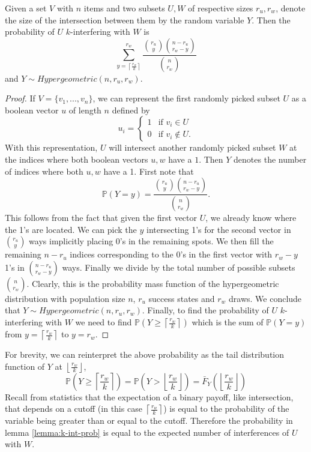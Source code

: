 \begin{lemma}
    \label{lemma:k-int-prob}
	Given a set $V$ with $n$ items and two subsets $U,W$ of respective sizes $r_u,r_w$, denote the size of the intersection between them by the random variable $Y$. Then the probability of $U$ $k$-interfering with $W$ is $$\sum_{y = \left\lceil \frac{r_w}{k} \right\rceil}^{r_w} \frac{\binom{r_u}{y} \binom{n-r_u}{r_w-y}}{\binom{n}{r_w}}$$ and $Y \sim Hypergeometric(n, r_u, r_w)$.
\end{lemma}
\begin{proof}
	If $V = \{v_1,...,v_n\}$, we can represent the first randomly picked subset $U$ as a boolean vector $u$ of length $n$ defined by
    $$
    u_i = \begin{cases}
        1 & \text{if } v_i \in U \\
        0 & \text{if } v_i \notin U.
    \end{cases}
    $$
    With this representation, $U$ will intersect another randomly picked subset $W$ at the indices where both boolean vectors $u, w$ have a $1$. Then $Y$ denotes the number of indices where both $u, w$ have a 1. First note that
    \begin{equation}
        \mathbb{P}(Y=y) = \frac{\binom{r_u}{y} \binom{n-r_u}{r_w-y}}{\binom{n}{r_w}}.
    \end{equation}
    This follows from the fact that given the first vector $U$, we already know where the 1's are located. We can pick the $y$ intersecting 1's for the second vector in $\binom{r_u}{y}$ ways implicitly placing 0's in the remaining spots. We then fill the remaining $n-r_u$ indices corresponding to the 0's in the first vector with $r_w-y$ 1's in $\binom{n-r_u}{r_w-y}$ ways. Finally we divide by the total number of possible subsets $\binom{n}{r_w}$. Clearly, this is the probability mass function of the hypergeometric distribution with population size $n$, $r_u$ success states and $r_w$ draws. We conclude that $Y \sim Hypergeometric(n, r_u, r_w)$. Finally, to find the probability of $U$ $k$-interfering with $W$ we need to find $\mathbb{P}(Y \ge \left\lceil \frac{r_w}{k} \right\rceil)$ which is the sum of $\mathbb{P}(Y=y)$ from $y = \left\lceil \frac{r_w}{k} \right\rceil$ to $y = r_w$.
\end{proof}

For brevity, we can reinterpret the above probability as the tail distribution function of $Y$ at $\left\lfloor \frac{r_w}{k} \right\rfloor$, 
$$
\mathbb{P}\left(Y \geq \left\lceil \frac{r_w}{k} \right\rceil\right) = \mathbb{P}\left(Y > \left\lfloor \frac{r_w}{k} \right\rfloor\right) = \bar{F}_Y\left(\left\lfloor \frac{r_w}{k} \right\rfloor\right)
$$
Recall from statistics that the expectation of a binary payoff, like intersection, that depends on a cutoff (in this case $\left\lceil \frac{r_w}{k} \right\rceil$) is equal to the probability of the variable being greater than or equal to the cutoff. Therefore the probability in lemma \ref{lemma:k-int-prob} is equal to the expected number of interferences of $U$ with $W$. 

